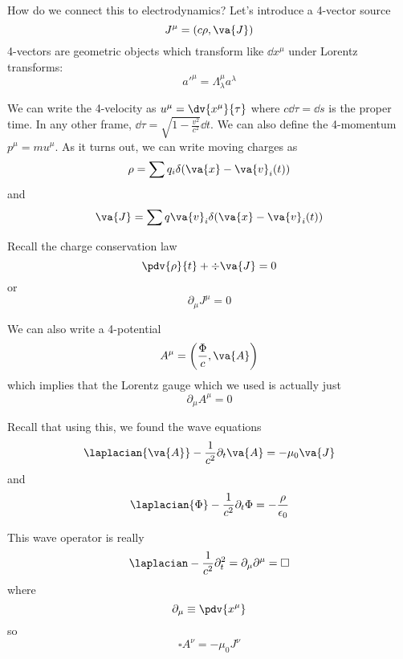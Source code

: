 \documentclass[a4paper,twoside,master.tex]{subfiles}
\begin{document}
How do we connect this to electrodynamics? Let's introduce a 4-vector source
\begin{equation}
    J^{\mu} = (c \rho, \va{J})
\end{equation}
4-vectors are geometric objects which transform like $ \dd{x^{\mu}} $ under Lorentz transforms:
\begin{equation}
    a'^{\mu} = \Lambda^{\mu}_{\lambda} a^{\lambda}
\end{equation}

We can write the 4-velocity as $ u^{\mu} = \dv{x^{\mu}}{\tau} $ where $ c \dd{\tau} = \dd{s} $ is the proper time. In any other frame, $ \dd{\tau} = \sqrt{1 - \frac{v^2}{c^2}} \dd{t} $. We can also define the 4-momentum $ p^{\mu} = m u^{\mu} $. As it turns out, we can write moving charges as
\begin{equation}
    \rho = \sum q_i \delta( \va{x} - \va{v}_i(t))
\end{equation}
and
\begin{equation}
    \va{J} = \sum q \va{v}_i \delta( \va{x} - \va{v}_i(t))
\end{equation}

Recall the charge conservation law
\begin{equation}
    \pdv{\rho}{t} + \div{ \va{J}} = 0
\end{equation}
or
\begin{equation}
    \partial_{\mu} J^{\mu} = 0
\end{equation}

We can also write a 4-potential
\begin{equation}
    A^{\mu} = \left( \frac{\Phi}{c}, \va{A} \right)
\end{equation}
which implies that the Lorentz gauge which we used is actually just
\begin{equation}
    \partial_{\mu} A^{\mu} = 0
\end{equation}

Recall that using this, we found the wave equations
\begin{equation}
    \laplacian{ \va{A}} - \frac{1}{c^2} \partial_t \va{A} = - \mu_0 \va{J}
\end{equation}
and
\begin{equation}
    \laplacian{\Phi} - \frac{1}{c^2} \partial_t \Phi = - \frac{\rho}{\epsilon_0}
\end{equation}

This wave operator is really
\begin{equation}
    \laplacian - \frac{1}{c^2} \partial_t^2 = \partial_{\mu} \partial^{\mu} = \square
\end{equation}
where
\begin{equation}
    \partial_{\mu} \equiv \pdv{x^{\mu}}
\end{equation}
so
\begin{equation}
    \square A^{\nu} = - \mu_0 J^{\nu}
\end{equation}
\end{document}

